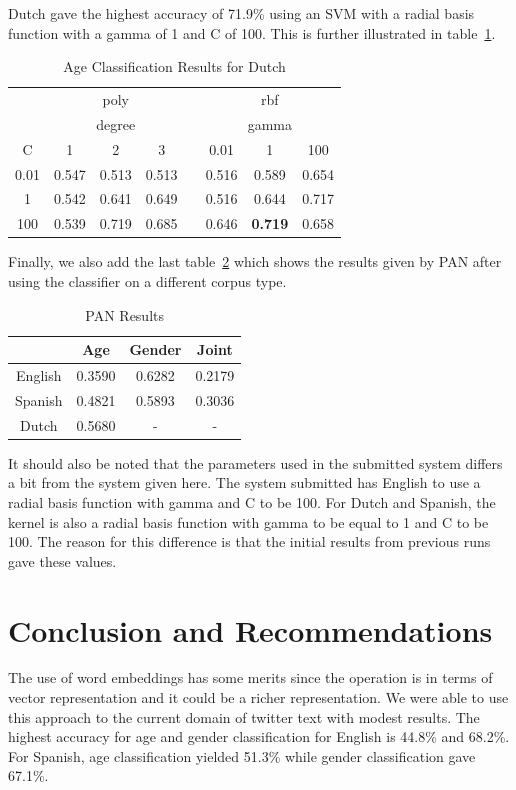 \documentclass{llncs}
\begin{document}
Dutch gave the highest accuracy of 71.9\% using an SVM with a radial basis function with a gamma of 1 and C of 100. This is further illustrated in table~\ref{DutchAge}. 
\begin{table}[!htbp]
\centering
\caption{Age Classification Results for Dutch}
\label{DutchAge}
\begin{tabular}{cccccccc}
\toprule
     & \multicolumn{3}{c}{poly}   &  & \multicolumn{3}{c}{rbf}   \\
     & \multicolumn{3}{c}{degree} &  & \multicolumn{3}{c}{gamma} \\
C    & 1       & 2       & 3      &  & 0.01    & 1       & 100   \\
\midrule
0.01 & 0.547   & 0.513   & 0.513  &  & 0.516   & 0.589   & 0.654 \\
1    & 0.542   & 0.641   & 0.649  &  & 0.516   & 0.644   & 0.717 \\
100  & 0.539   & 0.719   & 0.685  &  & 0.646   & \textbf{0.719}   & 0.658 \\
\bottomrule
\end{tabular}
\end{table}

Finally, we also add the last table~\ref{PANResults} which shows the results given by PAN after using the classifier on a different corpus type. 
\begin{table}[!htbp]
\centering
\caption{PAN Results}
\label{PANResults}
\begin{tabular}{cccc}
\toprule
        & Age    & Gender & Joint  \\
\midrule
English & 0.3590 & 0.6282 & 0.2179 \\
Spanish & 0.4821 & 0.5893 & 0.3036 \\
Dutch   & 0.5680 &   -     &  -    \\
\bottomrule 
\end{tabular}
\end{table}

It should also be noted that the parameters used in the submitted system differs a bit from the system given here. The system submitted has English to use a radial basis function with gamma and C to be 100. For Dutch and Spanish, the kernel is also a radial basis function with gamma to be equal to 1 and C to be 100. The reason for this difference is that the initial results from previous runs gave these values. 

\section{Conclusion and Recommendations}
The use of word embeddings has some merits since the operation is in terms of vector representation and it could be a richer representation. We were able to use this approach to the current domain of twitter text with modest results. The highest accuracy for age and gender classification for English is 44.8\% and 68.2\%. For Spanish, age classification yielded 51.3\% while gender classification gave 67.1\%. 
\end{document}
